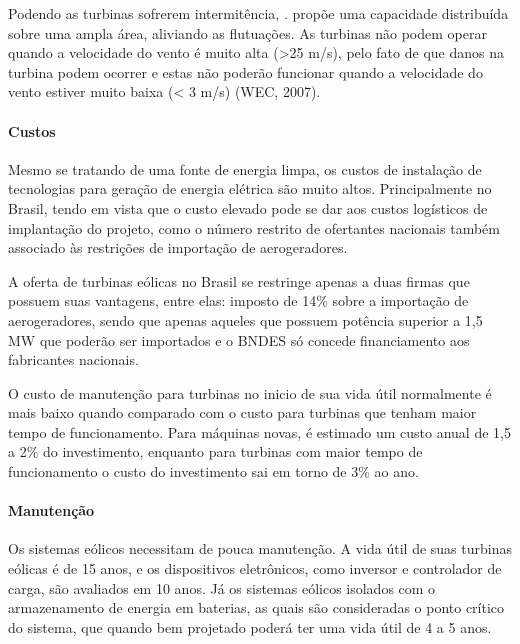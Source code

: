   Podendo as turbinas sofrerem intermitência, \cite{edmondes2007}. propõe uma capacidade distribuída sobre uma ampla área, aliviando as flutuações. As turbinas não podem operar quando a velocidade do vento é muito alta (>25 m/s), pelo fato de que danos na turbina podem ocorrer e estas não poderão funcionar quando a velocidade do vento estiver muito baixa (< 3 m/s) (WEC, 2007).
  
  \paragraph{Custos}
  Mesmo se tratando de uma fonte de energia limpa, os custos de instalação de tecnologias para geração de energia elétrica são muito altos. Principalmente no Brasil, tendo em vista que o custo elevado pode se dar aos custos logísticos de implantação do projeto, como o número restrito de ofertantes nacionais também associado às restrições de importação de aerogeradores.
  
  A oferta de turbinas eólicas no Brasil se restringe apenas a duas firmas que possuem suas vantagens, entre elas: imposto de 14\% sobre a importação de aerogeradores, sendo que apenas aqueles que possuem potência superior a 1,5 MW que poderão ser importados e o BNDES só concede financiamento aos fabricantes nacionais.

  O custo de manutenção para turbinas no inicio de sua vida útil normalmente é mais baixo quando comparado com o custo para turbinas que tenham maior tempo de funcionamento. Para máquinas novas, é estimado um custo anual de 1,5 a 2\% do investimento, enquanto para turbinas com maior tempo de funcionamento o custo do investimento sai em torno de 3\% ao ano.
  
  \paragraph{Manutenção}
  Os sistemas eólicos necessitam de pouca manutenção. A vida útil de suas turbinas eólicas é de 15 anos, e os dispositivos eletrônicos, como inversor e controlador de carga, são avaliados em 10 anos. Já os sistemas eólicos isolados com o armazenamento de energia em baterias, as quais são consideradas o ponto crítico do sistema, que quando bem projetado poderá ter uma vida útil de 4 a 5 anos.
